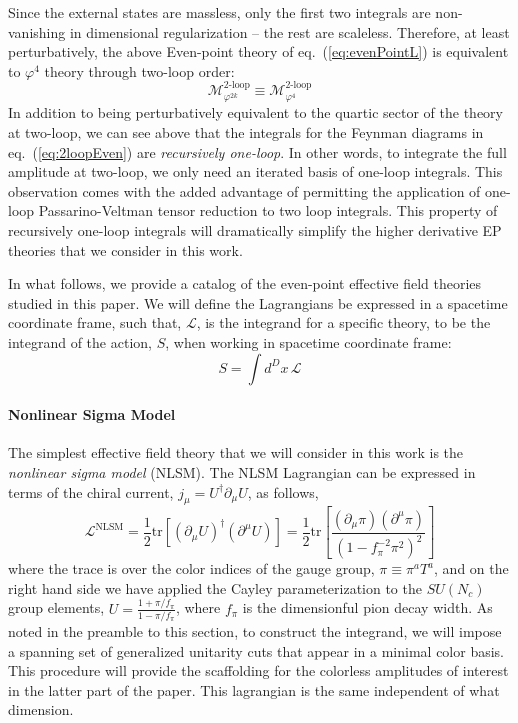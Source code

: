 \documentclass[12pt,letter]{article}
\def\eqn#1{eq.~(\ref{#1})}
\def\be{\begin{equation}}
\def\ee{\end{equation}}
\begin{document}
Since the external states are massless, only the first two integrals are non-vanishing in dimensional regularization -- the rest are scaleless. Therefore, at least perturbatively, the above Even-point theory of \eqn{eq:evenPointL} is equivalent to $\varphi^4$ theory through two-loop order: 
\begin{equation}
\mathcal{M}_{\varphi^{2k}}^{\text{2-loop}} \equiv \mathcal{M}_{\varphi^{4}}^{\text{2-loop}} 
\end{equation}
In addition to being perturbatively equivalent to the quartic sector of the theory at two-loop, we can see above that the integrals for the Feynman diagrams in \eqn{eq:2loopEven} are \textit{recursively one-loop}. In other words, to integrate the full amplitude at two-loop, we only need an iterated basis of one-loop integrals. This observation comes with the added advantage of permitting the application of one-loop Passarino-Veltman tensor reduction \cite{Passarino:1978jh} to two loop integrals. This property of recursively one-loop integrals will dramatically simplify the higher derivative EP theories that we consider in this work. 

In what follows, we provide a catalog of the even-point effective field theories studied in this paper. We will define the Lagrangians  be expressed in a spacetime coordinate frame, such that, $\mathcal{L}$, is the integrand for a specific theory, to be the integrand of the action, $S$, when working in spacetime coordinate frame:
\be
S= \int d^D x \,\mathcal{L}
\ee

\paragraph{Nonlinear Sigma Model}
The simplest effective field theory that we will consider in this work is the \textit{nonlinear sigma model} (NLSM). The NLSM Lagrangian can be expressed in terms of the chiral current, $j_\mu = U^\dagger \partial_\mu U$, as follows,
\be
\mathcal{L}^{\text{NLSM}}= \frac{1}{2}\text{tr}[(\partial_\mu U)^\dagger (\partial ^\mu U)] = \frac{1}{2}\text{tr}\left[\frac{(\partial_\mu\pi )( \partial^\mu \pi) }{(1-f_\pi^{-2}\pi^2)^2}\right]
\ee
where the trace is over the color indices of the gauge group, $\pi \equiv \pi^a T^a$, and on the right hand side we have applied the Cayley parameterization to the $SU(N_c)$ group elements, $U= \frac{1+\pi/f_\pi}{1-\pi/f_\pi}$, where $f_\pi$ is the dimensionful pion decay width. As noted in the preamble to this section, to construct the integrand, we will impose a spanning set of generalized unitarity cuts that appear in a minimal color basis. This procedure will provide the scaffolding for the colorless amplitudes of interest in the latter part of the paper.  This lagrangian is the same independent of what dimension.
\end{document}
